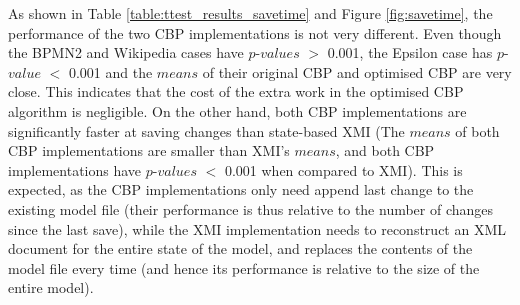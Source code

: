 \documentclass{llncs}
\begin{document}
{   
    
    As shown in Table \ref{table:ttest_results_savetime} and Figure \ref{fig:savetime}, the performance of the two CBP implementations is not very different. Even though the BPMN2 and Wikipedia cases have $p$-$values$ $>$ 0.001, the Epsilon case has $p$-$value$ $<$ 0.001 and the $means$ of their original CBP and optimised CBP are very close. This indicates that the cost of the extra work in the optimised CBP algorithm is negligible. On the other hand, both CBP implementations are significantly faster at saving changes than state-based XMI (The $means$ of both CBP implementations are smaller than XMI's $means$, and both CBP implementations have $p$-$values$ $<$ 0.001 when compared to XMI). This is expected, as the CBP implementations only need append last change to the existing model file (their performance is thus relative to the number of changes since the last save), while the XMI implementation needs to reconstruct an XML document for the entire state of the model, and replaces the contents of the model file every time (and hence its performance is relative to the size of the entire model). 
    
}
\end{document}
